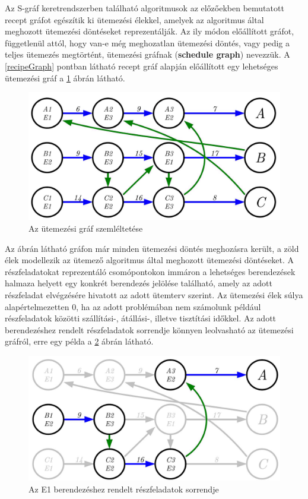 Az S-gráf keretrendszerben található algoritmusok az előzőekben bemutatott recept gráfot egészítik ki ütemezési élekkel, amelyek az algoritmus által meghozott ütemezési döntéseket reprezentálják.
Az ily módon előállított gráfot, függetlenül attól, hogy van-e még meghozatlan ütemezési döntés, vagy pedig a teljes ütemezés megtörtént, ütemezési gráfnak (\textbf{schedule graph}) nevezzük.
A \ref{recipeGraph} pontban látható recept gráf alapján előállított egy lehetséges ütemezési gráf a \ref{scheduleGraph} ábrán látható.
\begin{figure}[H]
\begin{center}
\includegraphics[scale=0.375]{scheduleGraph}
\caption{Az ütemezési gráf szemléltetése}
\label{scheduleGraph}
\end{center}
\end{figure}
Az ábrán látható gráfon már minden ütemezési döntés meghozásra került, a zöld élek modellezik az ütemező algoritmus által meghozott ütemezési döntéseket.
A részfeladatokat reprezentáló csomópontokon immáron a lehetséges berendezések halmaza helyett egy konkrét berendezés jelölése található, amely az adott részfeladat elvégzésére hivatott az adott ütemterv szerint.
Az ütemezési élek súlya alapértelmezetten $0$, ha az adott problémában nem számolunk például részfeladatok közötti szállítási-, átállási-, illetve tisztítási időkkel.
Az adott berendezéshez rendelt részfeladatok sorrendje könnyen leolvasható az ütemezési gráfról, erre egy példa a \ref{unitSequence} ábrán látható.
\begin{figure}[H]
\begin{center}
\includegraphics[scale=0.375]{unitSequence}
\caption{Az E1 berendezéshez rendelt részfeladatok sorrendje}
\label{unitSequence}
\end{center}
\end{figure}
